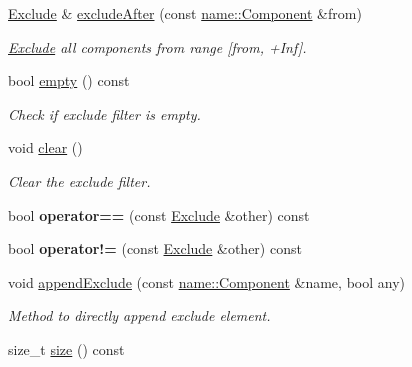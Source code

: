 \begin{DoxyCompactItemize}
\hyperlink{classndn_1_1Exclude}{Exclude} \& \hyperlink{classndn_1_1Exclude_ac846c5330169257f3eee049299bce5f8}{exclude\+After} (const \hyperlink{classndn_1_1name_1_1Component}{name\+::\+Component} \&from)
\begin{DoxyCompactList}\small\item\em \hyperlink{classndn_1_1Exclude}{Exclude} all components from range \mbox{[}from, +\+Inf\mbox{]}. \end{DoxyCompactList}\item 
bool \hyperlink{classndn_1_1Exclude_a783fc168f290ef705dd683356daa624d}{empty} () const\hypertarget{classndn_1_1Exclude_a783fc168f290ef705dd683356daa624d}{}\label{classndn_1_1Exclude_a783fc168f290ef705dd683356daa624d}

\begin{DoxyCompactList}\small\item\em Check if exclude filter is empty. \end{DoxyCompactList}\item 
void \hyperlink{classndn_1_1Exclude_af16410c50be862e58d3b92e198bb7098}{clear} ()\hypertarget{classndn_1_1Exclude_af16410c50be862e58d3b92e198bb7098}{}\label{classndn_1_1Exclude_af16410c50be862e58d3b92e198bb7098}

\begin{DoxyCompactList}\small\item\em Clear the exclude filter. \end{DoxyCompactList}\item 
bool {\bfseries operator==} (const \hyperlink{classndn_1_1Exclude}{Exclude} \&other) const\hypertarget{classndn_1_1Exclude_aaeb1e7e3e44986da1f178637e78dd227}{}\label{classndn_1_1Exclude_aaeb1e7e3e44986da1f178637e78dd227}

\item 
bool {\bfseries operator!=} (const \hyperlink{classndn_1_1Exclude}{Exclude} \&other) const\hypertarget{classndn_1_1Exclude_add401a1b0fa7e1a35a54a05594886843}{}\label{classndn_1_1Exclude_add401a1b0fa7e1a35a54a05594886843}

\item 
void \hyperlink{classndn_1_1Exclude_a0876f33d0f2cccc1fbb5e214e6849665}{append\+Exclude} (const \hyperlink{classndn_1_1name_1_1Component}{name\+::\+Component} \&name, bool any)
\begin{DoxyCompactList}\small\item\em Method to directly append exclude element. \end{DoxyCompactList}\item 
size\+\_\+t \hyperlink{classndn_1_1Exclude_a10f7cadad1b577b723f23a5d6e57a91e}{size} () const\hypertarget{classndn_1_1Exclude_a10f7cadad1b577b723f23a5d6e57a91e}{}\label{classndn_1_1Exclude_a10f7cadad1b577b723f23a5d6e57a91e}


\end{DoxyCompactItemize}
